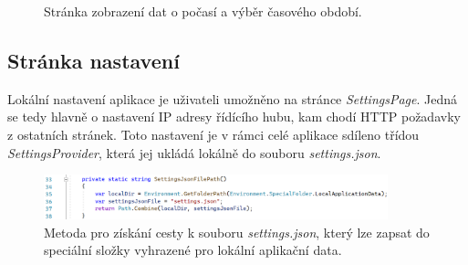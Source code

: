 \begin{figure}[hbt]
\centering
{}
\caption{Stránka zobrazení dat o počasí a výběr časového období.}
\end{figure}


\subsection{Stránka nastavení}
Lokální nastavení aplikace je uživateli umožněno na stránce {\it SettingsPage}. Jedná se tedy hlavně o nastavení IP adresy řídícího hubu, kam chodí HTTP požadavky z ostatních stránek. Toto nastavení je v rámci celé aplikace sdíleno třídou {\it SettingsProvider}, která jej ukládá lokálně do souboru {\it settings.json}.

\begin{figure}[hbt]
\includegraphics[width=0.89\textwidth]{obrazky-figures/code-settingsprovider.png}
\caption{Metoda pro získání cesty k souboru {\it settings.json}, který lze zapsat do speciální složky vyhrazené pro lokální aplikační data.}
\end{figure}

